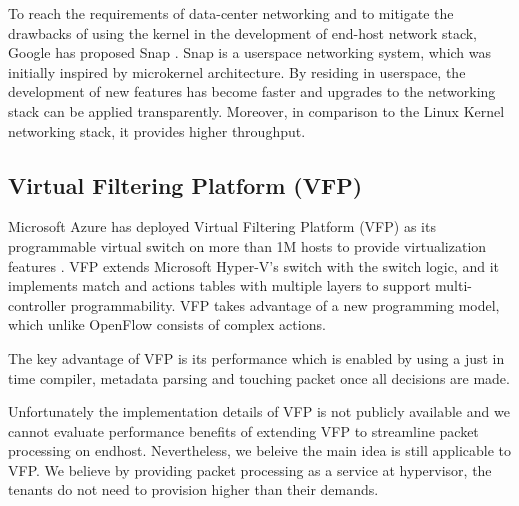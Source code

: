 To reach the requirements of data-center networking and to mitigate the drawbacks of using 
the kernel in the development of end-host network stack, Google has proposed Snap \cite{marty2019snap}. Snap is 
a userspace networking system, which was initially inspired by microkernel architecture. 
By residing in userspace, the development of new features has become faster and upgrades to
the networking stack can be applied transparently. Moreover, in comparison to the Linux Kernel 
networking stack, it provides higher throughput.

\subsection{Virtual Filtering Platform (VFP)}
\label{vfp}

Microsoft Azure has deployed Virtual Filtering Platform (VFP) as its programmable 
virtual switch on more than 1M hosts to provide virtualization features 
\cite{firestone2017vfp}. VFP extends Microsoft Hyper-V's switch 
\cite{hyperv} with the switch logic, and it implements match and actions tables 
with multiple layers to support multi-controller programmability. VFP takes 
advantage of a new programming model, which unlike OpenFlow consists of complex actions.

The key advantage of VFP is its performance which is enabled by using a just in time compiler,
metadata parsing and touching packet once all decisions are made. 

Unfortunately the implementation details of VFP is not publicly available and we cannot 
evaluate performance benefits of extending VFP to streamline packet processing on endhost. 
Nevertheless,  we beleive the main idea is still applicable to VFP. 
We believe by providing packet processing as a service at 
hypervisor, the tenants do not need to provision higher than their demands.



